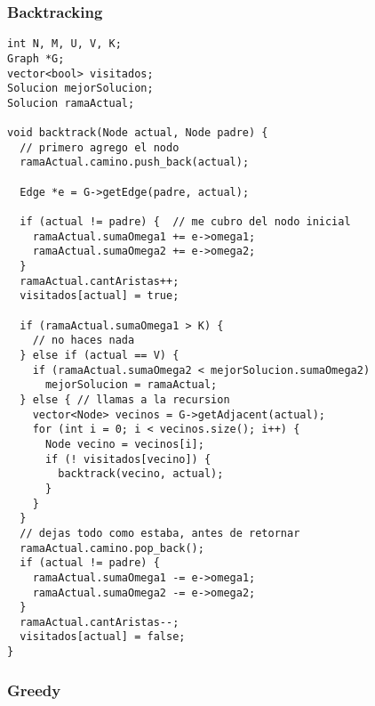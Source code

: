 
\subsubsection{Backtracking}

\small
\begin{verbatim}
int N, M, U, V, K;
Graph *G;
vector<bool> visitados;
Solucion mejorSolucion;
Solucion ramaActual;

void backtrack(Node actual, Node padre) {
  // primero agrego el nodo
  ramaActual.camino.push_back(actual);

  Edge *e = G->getEdge(padre, actual);

  if (actual != padre) {  // me cubro del nodo inicial
    ramaActual.sumaOmega1 += e->omega1;
    ramaActual.sumaOmega2 += e->omega2;
  }
  ramaActual.cantAristas++;
  visitados[actual] = true;
  
  if (ramaActual.sumaOmega1 > K) {
    // no haces nada
  } else if (actual == V) { 
    if (ramaActual.sumaOmega2 < mejorSolucion.sumaOmega2)
      mejorSolucion = ramaActual;
  } else { // llamas a la recursion
    vector<Node> vecinos = G->getAdjacent(actual);
    for (int i = 0; i < vecinos.size(); i++) {
      Node vecino = vecinos[i];
      if (! visitados[vecino]) {
        backtrack(vecino, actual);
      }
    }
  }
  // dejas todo como estaba, antes de retornar
  ramaActual.camino.pop_back();
  if (actual != padre) {
    ramaActual.sumaOmega1 -= e->omega1;
    ramaActual.sumaOmega2 -= e->omega2;
  }
  ramaActual.cantAristas--;
  visitados[actual] = false;
}
\end{verbatim}
\normalsize

\subsubsection{Greedy}

